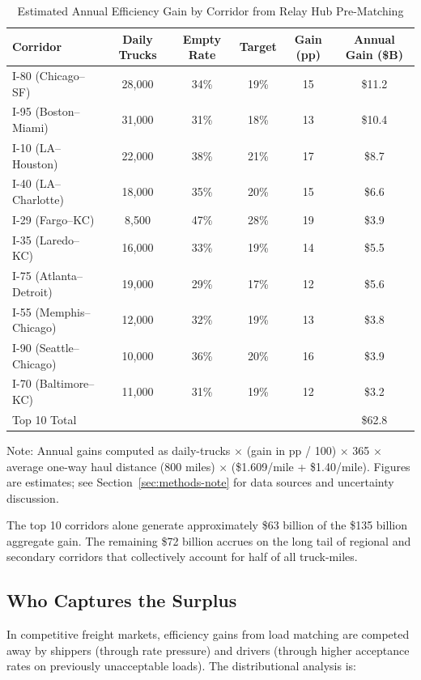 \begin{table}[h]
\centering
\caption{Estimated Annual Efficiency Gain by Corridor from Relay Hub Pre-Matching}
\label{tab:corridors}
\begin{tabular}{lccccc}
\toprule
Corridor & Daily Trucks & Empty Rate & Target & Gain (pp) & Annual Gain (\$B) \\
\midrule
I-80 (Chicago--SF) & 28,000 & 34\% & 19\% & 15 & \$11.2 \\
I-95 (Boston--Miami) & 31,000 & 31\% & 18\% & 13 & \$10.4 \\
I-10 (LA--Houston) & 22,000 & 38\% & 21\% & 17 & \$8.7 \\
I-40 (LA--Charlotte) & 18,000 & 35\% & 20\% & 15 & \$6.6 \\
I-29 (Fargo--KC) & 8,500 & 47\% & 28\% & 19 & \$3.9 \\
I-35 (Laredo--KC) & 16,000 & 33\% & 19\% & 14 & \$5.5 \\
I-75 (Atlanta--Detroit) & 19,000 & 29\% & 17\% & 12 & \$5.6 \\
I-55 (Memphis--Chicago) & 12,000 & 32\% & 19\% & 13 & \$3.8 \\
I-90 (Seattle--Chicago) & 10,000 & 36\% & 20\% & 16 & \$3.9 \\
I-70 (Baltimore--KC) & 11,000 & 31\% & 19\% & 12 & \$3.2 \\
\midrule
Top 10 Total & & & & & \$62.8 \\
\bottomrule
\end{tabular}
\end{table}

\noindent Note: Annual gains computed as daily-trucks $\times$ (gain in pp / 100) $\times$ 365 $\times$ average one-way haul distance (800 miles) $\times$ (\$1.609/mile + \$1.40/mile). Figures are estimates; see Section~\ref{sec:methods-note} for data sources and uncertainty discussion.

The top 10 corridors alone generate approximately \$63 billion of the \$135 billion aggregate gain. The remaining \$72 billion accrues on the long tail of regional and secondary corridors that collectively account for half of all truck-miles.

\subsection{Who Captures the Surplus}

In competitive freight markets, efficiency gains from load matching are competed away by shippers (through rate pressure) and drivers (through higher acceptance rates on previously unacceptable loads). The distributional analysis is:

